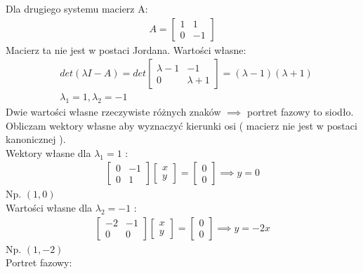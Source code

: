 \documentclass[a4paper,11pt]{article}
\begin{document}
\begin{figure}[H]
\begin{center}
\end{center}
\end{figure}
Dla drugiego systemu macierz A:
\begin{align*}
A = 
\begin{bmatrix}
1 & 1 \\
0 & -1
\end{bmatrix}
\end{align*}
Macierz ta nie jest w postaci Jordana. Wartości własne:
\begin{align*}
&det( \lambda I - A ) =
det
\begin{bmatrix}
\lambda -1  & -1 \\
0 & \lambda + 1
\end{bmatrix} =
( \lambda - 1 )( \lambda + 1 )\\
&\lambda _{1} = 1, \lambda _{2} = -1
\end{align*}
Dwie wartości własne rzeczywiste różnych znaków \( \implies \) portret fazowy to siodło. Obliczam wektory własne aby wyznaczyć kierunki osi ( macierz nie jest w postaci kanonicznej ). \\ Wektory własne dla \( \lambda _{1} = 1 \) : 
\begin{align*}
\begin{bmatrix}
0 & -1 \\
0 & 1 
\end{bmatrix}
\begin{bmatrix}
x \\
y
\end{bmatrix}
=
\begin{bmatrix}
0 \\
0
\end{bmatrix}
\implies
y = 0
\end{align*}
Np. \( ( 1,0) \) \\
Wartości własne dla \( \lambda _{2} = -1 \) :
\begin{align*}
\begin{bmatrix}
-2 & -1 \\
0 & 0 
\end{bmatrix}
\begin{bmatrix}
x \\
y
\end{bmatrix}
=
\begin{bmatrix}
0 \\
0
\end{bmatrix}
\implies
y = -2x
\end{align*}
Np. \( (1,-2) \) \\
Portret fazowy:
\end{document}
